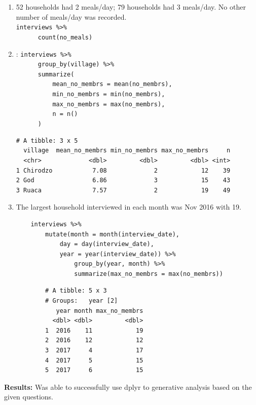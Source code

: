 \documentclass{article}
\begin{document}
\begin{enumerate}
    \item 52 households had 2 meals/day; 79 households had 3 meals/day. No other number of meals/day was recorded.\\
    \verb|interviews %>%|\\
    \verb|      count(no_meals)|
    \newpage
    \item:
    \verb|interviews %>%|\\
    \verb|      group_by(village) %>%|\\
    \verb|      summarize(|\\
    \verb|          mean_no_membrs = mean(no_membrs),|\\
    \verb|          min_no_membrs = min(no_membrs),|\\
    \verb|          max_no_membrs = max(no_membrs),|\\
    \verb|          n = n()|\\
    \verb|      )|
    \begin{verbatim}
# A tibble: 3 x 5
  village  mean_no_membrs min_no_membrs max_no_membrs     n
  <chr>             <dbl>         <dbl>         <dbl> <int>
1 Chirodzo           7.08             2            12    39
2 God                6.86             3            15    43
3 Ruaca              7.57             2            19    49
    \end{verbatim}
    \item The largest household interviewed in each month was Nov 2016 with 19.
    \begin{verbatim}
    interviews %>%
        mutate(month = month(interview_date),
            day = day(interview_date),
            year = year(interview_date)) %>%
                group_by(year, month) %>%
                summarize(max_no_membrs = max(no_membrs))
    \end{verbatim}
    \newpage
    \begin{verbatim}
        # A tibble: 5 x 3
        # Groups:   year [2]
           year month max_no_membrs
          <dbl> <dbl>         <dbl>
        1  2016    11            19
        2  2016    12            12
        3  2017     4            17
        4  2017     5            15
        5  2017     6            15
    \end{verbatim}
\end{enumerate}
\textbf{Results:} Was able to successfully use dplyr to generative analysis based on the given questions.
\end{document}
